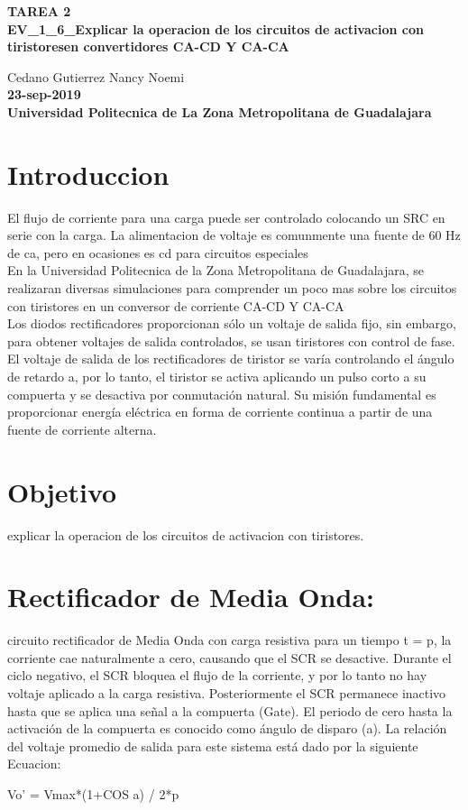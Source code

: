 \documentclass[11pt,a4paper]{article}
\begin{document}
\begin{center}
\textbf{TAREA 2}\\
\textbf{EV_1_6_Explicar la operacion de los circuitos de activacion con tiristoresen convertidores CA-CD Y CA-CA}
\end{center}

\begin{center}
Cedano Gutierrez Nancy Noemi\\
\textbf{23-sep-2019}\\
\textbf{Universidad Politecnica de La Zona Metropolitana de Guadalajara}
\end{center}

\section{Introduccion}
El flujo de corriente para una carga puede ser controlado colocando un SRC en serie con la carga. La alimentacion de voltaje es comunmente una fuente de 60 Hz de ca, pero en ocasiones es cd para circuitos especiales\\
En la Universidad Politecnica de la Zona Metropolitana de Guadalajara, se realizaran diversas simulaciones para comprender un poco mas sobre los circuitos con tiristores en un conversor de corriente CA-CD Y CA-CA\\
Los diodos rectificadores proporcionan sólo un voltaje de salida fijo, sin embargo, para obtener voltajes de salida controlados, se usan tiristores con control de fase. 
El voltaje de salida de los rectificadores de tiristor se varía controlando el ángulo de retardo a, por lo tanto, el tiristor se activa aplicando un pulso corto a su compuerta y se desactiva por conmutación natural.
Su misión fundamental es proporcionar energía eléctrica en forma de corriente continua a partir de una fuente de corriente alterna. \\
\section{Objetivo}
explicar la operacion de los circuitos de activacion con tiristores.

\section{Rectificador de Media Onda:}
circuito rectificador de Media Onda con carga resistiva para un tiempo t = p, la corriente cae naturalmente a cero, causando que el SCR se desactive. Durante el ciclo negativo, el SCR bloquea el flujo de la corriente, y por lo tanto no hay voltaje aplicado a la carga resistiva. Posteriormente el SCR permanece inactivo hasta que se aplica una señal a la compuerta (Gate). El periodo de cero hasta la activación de la compuerta es conocido como ángulo de disparo (a). La relación del voltaje promedio de salida para este sistema está dado por la siguiente Ecuacion:
\begin{center}
Vo' = Vmax*(1+COS a) / 2*p\\
\end{center}
\end{document}

